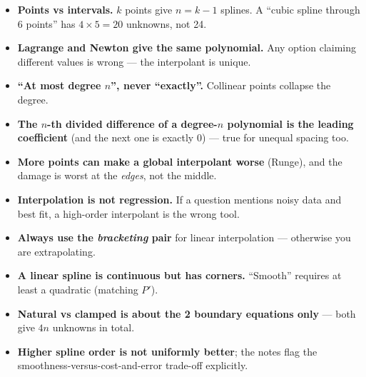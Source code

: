 \begin{trapbox}
\begin{itemize}
\item \textbf{Points vs intervals.} $k$ points give $n = k-1$ splines. A ``cubic spline through 6 points'' has $4\times5 = 20$ unknowns, not 24.
\item \textbf{Lagrange and Newton give the same polynomial.} Any option claiming different values is wrong --- the interpolant is unique.
\item \textbf{``At most degree $n$'', never ``exactly''.} Collinear points collapse the degree.
\item \textbf{The $n$-th divided difference of a degree-$n$ polynomial is the leading coefficient} (and the next one is exactly $0$) --- true for unequal spacing too.
\item \textbf{More points can make a global interpolant worse} (Runge), and the damage is worst at the \emph{edges}, not the middle.
\item \textbf{Interpolation is not regression.} If a question mentions noisy data and best fit, a high-order interpolant is the wrong tool.
\item \textbf{Always use the \emph{bracketing} pair} for linear interpolation --- otherwise you are extrapolating.
\item \textbf{A linear spline is continuous but has corners.} ``Smooth'' requires at least a quadratic (matching $P'$).
\item \textbf{Natural vs clamped is about the 2 boundary equations only} --- both give $4n$ unknowns in total.
\item \textbf{Higher spline order is not uniformly better}; the notes flag the smoothness-versus-cost-and-error trade-off explicitly.
\end{itemize}
\end{trapbox}

